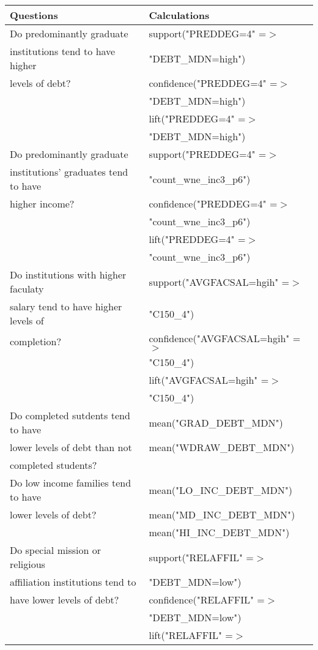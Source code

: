 \documentclass[11pt]{article}
\begin{document}
\begin{itemize}
\begin{center}
\begin{tabular}{|l|l|}
\hline
Questions & Calculations \\
\hline
Do predominantly graduate & support("PREDDEG=4" =$>$ \\
institutions tend to have higher & "DEBT\_MDN=high") \\
levels of debt? & confidence("PREDDEG=4" =$>$ \\
 & "DEBT\_MDN=high") \\
 & lift("PREDDEG=4" =$>$ \\
 & "DEBT\_MDN=high") \\
\hline
Do predominantly graduate & support("PREDDEG=4" =$>$ \\
institutions' graduates tend to have & "count\_wne\_inc3\_p6") \\
higher income? & confidence("PREDDEG=4" =$>$ \\
 & "count\_wne\_inc3\_p6") \\
 & lift("PREDDEG=4" =$>$ \\
 & "count\_wne\_inc3\_p6") \\
\hline
Do institutions with higher faculaty & support("AVGFACSAL=hgih" =$>$ \\
salary tend to have higher levels of & "C150\_4") \\
completion? & confidence("AVGFACSAL=hgih" =$>$ \\
 & "C150\_4") \\
 & lift("AVGFACSAL=hgih" =$>$ \\
 & "C150\_4") \\
\hline
Do completed sutdents tend to have & mean("GRAD\_DEBT\_MDN") \\
lower levels of debt than not & mean("WDRAW\_DEBT\_MDN") \\
completed students? & \\
\hline
Do low income families tend to have & mean("LO\_INC\_DEBT\_MDN") \\
lower levels of debt? & mean("MD\_INC\_DEBT\_MDN") \\
 & mean("HI\_INC\_DEBT\_MDN") \\
\hline
Do special mission or religious & support("RELAFFIL" =$>$ \\
affiliation institutions tend to & "DEBT\_MDN=low") \\
have lower levels of debt? & confidence("RELAFFIL" =$>$ \\
 & "DEBT\_MDN=low") \\
 & lift("RELAFFIL" =$>$ \\

\end{tabular}
\end{center}
\end{itemize}
\end{document}

